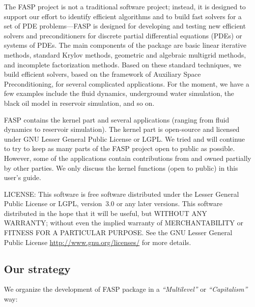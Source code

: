 \documentclass[11pt]{memoir}
\begin{document}
The FASP project is not a traditional software project; instead, it is designed to support our effort to identify efficient algorithms and to build fast solvers for a set of PDE problems---FASP is designed for developing and testing new efficient solvers and preconditioners for discrete partial differential equations (PDEs) or systems of PDEs. The main components of the package are basic linear iterative methods, standard Krylov methods, geometric and algebraic multigrid methods, and incomplete factorization methods. Based on these standard techniques, we build efficient solvers, based on the framework of Auxiliary Space Preconditioning, for several complicated applications. For the moment, we have a few examples include the fluid dynamics, underground water simulation, the black oil model in reservoir simulation, and so on.

FASP contains the kernel part and several applications (ranging from fluid dynamics to reservoir simulation). The kernel part is open-source and licensed under GNU Lesser General Public License or LGPL. We tried and will continue to try to keep as many parts of the FASP project open to public as possible. However, some of the applications contain contributions from and owned partially by other parties. We only discuss the kernel functions (open to public) in this user's guide.

\begin{snugshade}\noindent
LICENSE: This software is free software distributed under the Lesser General Public
License or LGPL, version~3.0 or any later versions. This software distributed
in the hope that it will be useful, but WITHOUT ANY WARRANTY; without even
the implied warranty of MERCHANTABILITY or FITNESS FOR A PARTICULAR PURPOSE. See the GNU Lesser General Public License \url{http://www.gnu.org/licenses/} for more details.
\end{snugshade}

\subsection{Our strategy}

We organize the development of FASP package in a \emph{``Multilevel''} or \emph{``Capitalism''} way:
\end{document}

